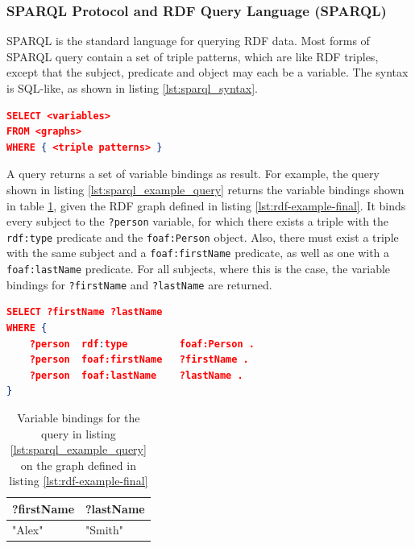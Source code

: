 \subsubsection{SPARQL Protocol and RDF Query Language (SPARQL)}
SPARQL\cite{sparql} is the standard language for querying RDF data\cite{perez2009semantics}.  
Most forms of SPARQL query contain a set of triple patterns, which are like RDF triples, except that the subject, predicate and object may each be a variable.
The syntax is SQL-like, as shown in listing \ref{lst:sparql_syntax}.

\begin{lstlisting}[language=json,basicstyle=\scriptsize,firstnumber=1,caption={Syntax of a SPARQL query},captionpos=b,label={lst:sparql_syntax}]
SELECT <variables>
FROM <graphs>
WHERE { <triple patterns> }
\end{lstlisting}

A query returns a set of variable bindings as result.
For example, the query shown in listing \ref{lst:sparql_example_query} returns the variable bindings shown in table \ref{tab:sparql_example_result}, given the RDF graph defined in listing \ref{lst:rdf-example-final}.
It binds every subject to the \texttt{?person} variable, for which there exists a triple with the \texttt{rdf:type} predicate and the \texttt{foaf:Person} object.
Also, there must exist a triple with the same subject and a \texttt{foaf:firstName} predicate, as well as one with a \texttt{foaf:lastName} predicate.
For all subjects, where this is the case, the variable bindings for \texttt{?firstName} and \texttt{?lastName} are returned.

\begin{lstlisting}[language=json,basicstyle=\scriptsize,firstnumber=1,caption={Example SPARQL query},captionpos=b,label={lst:sparql_example_query}]
SELECT ?firstName ?lastName
WHERE {
    ?person  rdf:type         foaf:Person .
    ?person  foaf:firstName   ?firstName .
    ?person  foaf:lastName    ?lastName .
}
\end{lstlisting}

\begin{table}[]
\caption{Variable bindings for the query in listing \ref{lst:sparql_example_query} on the graph defined in listing \ref{lst:rdf-example-final}}
\label{tab:sparql_example_result}
\centering\scriptsize
\begin{tabular}{@{}ll@{}}
\toprule
\textbf{?firstName} & \textbf{?lastName} \\ \midrule
"Alex"              & "Smith"           
\end{tabular}
\end{table}

